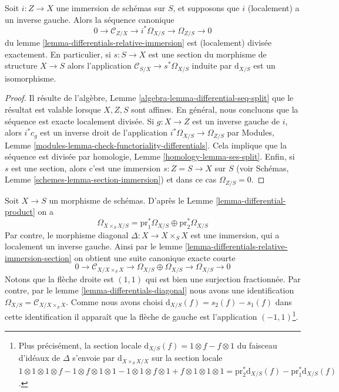 \begin{lemma}
\label{lemma-differentials-relative-immersion-section}
Soit $i : Z \to X$ une immersion de schémas sur $S$, et supposons
que $i$ (localement) a un inverse gauche. Alors la séquence
canonique
$$
0 \to \mathcal{C}_{Z/X} \to i^*\Omega_{X/S} \to \Omega_{Z/S} \to 0
$$
du
lemme \ref{lemma-differentials-relative-immersion} est (localement) divisée
exactement. En particulier, si $s : S \to X$ est une section
du morphisme de structure $X \to S$ alors
l'application $\mathcal{C}_{S/X} \to s^*\Omega_{X/S}$ induite par $\text{d}_{X/S}$
est un isomorphisme.
\end{lemma}

\begin{proof}
Il résulte de l'algèbre, Lemme \ref{algebra-lemma-differential-seq-split} que le résultat est valable
lorsque $X, Z, S$ sont affines. En général, nous concluons
que la séquence est exacte localement divisée. Si $g : X \to Z$
est un inverse gauche de $i$, alors
$i^*c_g$ est un inverse droit
de l'application $i^*\Omega_{X/S} \to \Omega_{Z/S}$ par Modules, Lemme \ref{modules-lemma-check-functoriality-differentials}.
Cela implique que la séquence est
divisée par homologie, Lemme \ref{homology-lemma-ses-split}.
Enfin, si $s$ est une section, alors c'est une immersion
$s : Z = S \to X$ sur $S$ (voir Schémas, Lemme \ref{schemes-lemma-section-immersion})
et dans ce cas $\Omega_{Z/S} = 0$.
\end{proof}

\begin{remark}
\label{remark-differentials-diagonal}
Soit $X \to S$ un morphisme de schémas.
D'après le Lemme \ref{lemma-differential-product}
on a
$$
\Omega_{X \times_S X/S} =
\text{pr}_1^*\Omega_{X/S} \oplus \text{pr}_2^*\Omega_{X/S}
$$
Par contre, le morphisme diagonal $\Delta : X \to X \times_S X$ est une immersion,
qui a localement un inverse gauche.
Ainsi par le lemme \ref{lemma-differentials-relative-immersion-section} on obtient une
suite canonique exacte courte
$$
0 \to \mathcal{C}_{X/X \times_S X} \to \Omega_{X/S} \oplus \Omega_{X/S}
\to \Omega_{X/S} \to 0
$$
Notons que la flèche droite est $(1, 1)$ qui
est bien une surjection fractionnée. Par
contre, par le lemme \ref{lemma-differentials-diagonal} nous avons une
identification $\Omega_{X/S} = \mathcal{C}_{X/X \times_S X}$. Comme nous avons choisi $\text{d}_{X/S}(f) = s_2(f) - s_1(f)$ dans cette
identification
il apparaît que la flèche de gauche est l'application
$(-1, 1)$\footnote{Plus précisément,
la section locale $\text{d}_{X/S}(f) = 1 \otimes f - f \otimes 1$ du faisceau d'idéaux de $\Delta$
s'envoie par $\text{d}_{X \times_S X/X}$ sur la section locale
$1 \otimes 1 \otimes 1 \otimes f - 1 \otimes f \otimes 1 \otimes 1
-1 \otimes 1 \otimes f \otimes 1 + f \otimes 1 \otimes 1 \otimes 1 =
\text{pr}_2^*\text{d}_{X/S}(f) - \text{pr}_1^*\text{d}_{X/S}(f)$.}.
\end{remark}

